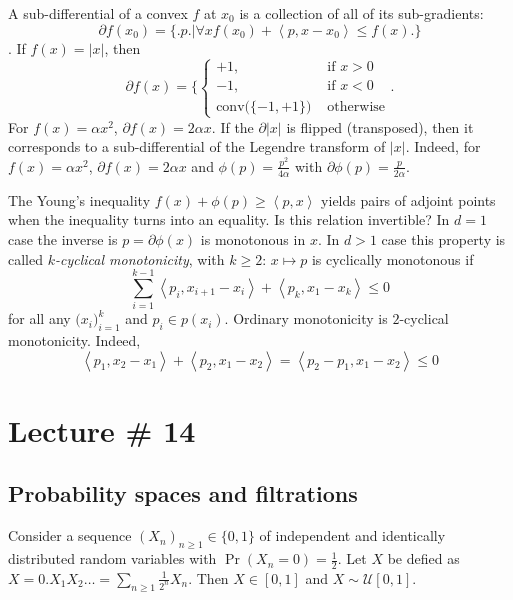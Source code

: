 \documentclass[a4paper]{article}
\newcommand{\brkt}[1]{{\left\langle #1 \right\rangle}}
\begin{document}
A sub-differential of a convex $f$ at $x_0$ is a collection of all of its sub-gradients:
\[\partial f(x_0) = \big\{\big. p \big.\big\rvert \forall x f(x_0) + \brkt{p,x-x_0} \leq f(x) \big.\big\}\].
If $f(x) = \lvert x\rvert$, then
\[\partial f(x) = \bigg\{\begin{cases}
	+1, &\text{ if } x>0\\
	-1, &\text{ if } x<0\\
	\text{conv}\big(\{-1,+1\}\big) &\text{ otherwise}
\end{cases}\bigg.\]
For $f(x) = \alpha x^2$, $\partial f(x) = 2\alpha x$.
If the $\partial \lvert x\rvert$ is flipped (transposed), then it corresponds to a sub-differential of the Legendre transform of $\lvert x\rvert$.
Indeed, for $f(x) = \alpha x^2$, $\partial f(x) = 2\alpha x$ and $\phi(p) = \frac{p^2}{4\alpha}$ with $\partial \phi(p) = \frac{p}{2\alpha}$.

The Young's inequality $f(x) + \phi(p) \geq \brkt{p,x}$ yields pairs of adjoint points when the inequality turns into an equality.
Is this relation invertible? In $d=1$ case the inverse is $p=\partial \phi(x)$ is monotonous in $x$.
In $d>1$ case this property is called \emph{$k$-cyclical monotonicity}, with $k\geq2$: $x\mapsto p$ is cyclically monotonous if
\[ \sum_{i=1}^{k-1} \brkt{p_i, x_{i+1}-x_i} + \brkt{p_k, x_1-x_k} \leq 0\]
for all any $\big(x_i\big)_{i=1}^k$ and $p_i \in p(x_i)$.
Ordinary monotonicity is $2$-cyclical monotonicity. Indeed, 
\[\brkt{p_1, x_2-x_1}+\brkt{p_2, x_1- x_2} = \brkt{p_2-p_1, x_1-x_2}\leq 0\]



\section{Lecture \# 14} %
\label{sec:lecture_14}

\subsection{Probability spaces and filtrations} %
\label{sub:probability_spaces_and_filtrations}


Consider a sequence $(X_n)_{n\geq 1}\in \{0,1\}$ of independent and identically
distributed random variables with $\Pr(X_n = 0) = \frac{1}{2}$. Let $X$ be defied
as $X=0.X_1X_2\ldots = \sum_{n\geq1}\frac{1}{2^n} X_n$. Then $X\in [0,1]$ and
$X\sim\mathcal{U}[0,1]$.
\end{document}
